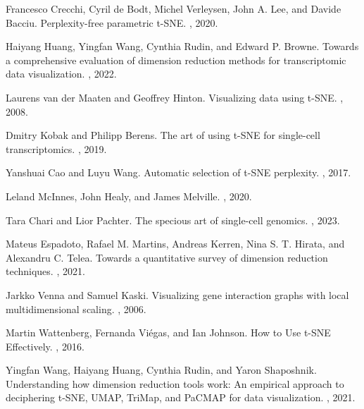 \documentclass{article}
\begin{document}
\begin{thebibliography}{10}

Francesco Crecchi, Cyril de Bodt, Michel Verleysen, John A. Lee, and Davide Bacciu.
\newblock Perplexity-free parametric t-SNE.
, 2020.

Haiyang Huang, Yingfan Wang, Cynthia Rudin, and Edward P. Browne.
\newblock Towards a comprehensive evaluation of dimension reduction methods for transcriptomic data visualization.
, 2022.

Laurens van der Maaten and Geoffrey Hinton.
\newblock Visualizing data using t-SNE.
, 2008.

Dmitry Kobak and Philipp Berens.
\newblock The art of using t-SNE for single-cell transcriptomics.
, 2019.

Yanshuai Cao and Luyu Wang. 
\newblock Automatic selection of t-SNE perplexity.
, 2017.

\newblock Leland McInnes, John Healy, and James Melville.
, 2020.

Tara Chari and Lior Pachter.
\newblock The specious art of single-cell genomics.
,  2023.

Mateus Espadoto, Rafael M. Martins, Andreas Kerren, Nina S. T. Hirata, and Alexandru C. Telea.
\newblock Towards a quantitative survey of dimension reduction techniques.
, 2021.

Jarkko Venna and Samuel Kaski.
\newblock Visualizing gene interaction graphs with local multidimensional scaling.
, 2006.

Martin Wattenberg, Fernanda Vi\'egas, and Ian Johnson.
\newblock How to Use t-SNE Effectively.
, 2016.

Yingfan Wang, Haiyang Huang, Cynthia Rudin, and Yaron Shaposhnik.
\newblock Understanding how dimension reduction tools work: An empirical approach to deciphering t-SNE, UMAP, TriMap, and PaCMAP for data visualization.
, 2021.


\end{thebibliography}
\end{document}
